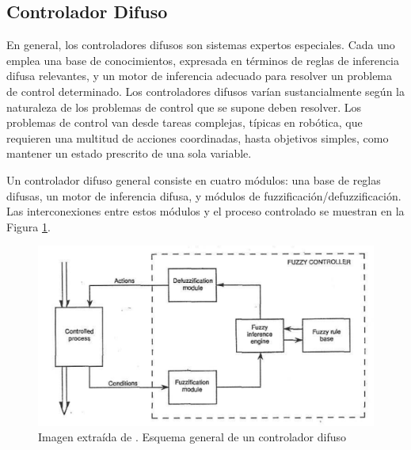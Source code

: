 \documentclass[10pt,twocolumn]{article}
\begin{document}
	\subsection{Controlador Difuso}
	
	En general, los controladores difusos son sistemas expertos especiales. Cada uno emplea una base de conocimientos, expresada en términos de reglas de inferencia difusa relevantes, y un motor de inferencia adecuado para resolver un problema de control determinado. Los controladores difusos varían sustancialmente según la naturaleza de los problemas de control que se supone deben resolver. Los problemas de control van desde tareas complejas, típicas en robótica, que requieren una multitud de acciones coordinadas, hasta objetivos simples, como mantener un estado prescrito de una sola variable.\cite{Fuzzy}
	
	Un controlador difuso general consiste en cuatro módulos: una base de reglas difusas, un motor de inferencia difusa, y módulos de fuzzificación/defuzzificación. Las interconexiones entre estos módulos y el proceso controlado se muestran en la Figura \ref{fig:diagram}.
	

	\begin{figure}[h]
		\centering
		\includegraphics[width=\linewidth]{diagram}
		\caption{Imagen extraída de \cite{Fuzzy}. Esquema general de un controlador difuso}
		\label{fig:diagram}
	\end{figure}
	
	
	
	 
\end{document}
